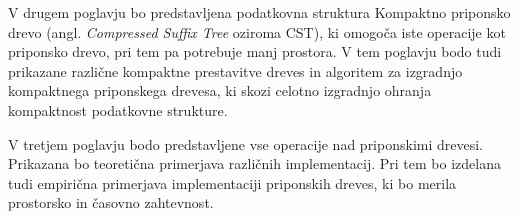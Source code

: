 
V drugem poglavju bo predstavljena podatkovna struktura Kompaktno priponsko drevo (angl. \textit{Compressed Suffix Tree} oziroma CST), ki omogoča iste operacije kot priponsko drevo, pri tem pa potrebuje manj prostora. V tem poglavju bodo tudi prikazane različne kompaktne prestavitve dreves in algoritem za izgradnjo kompaktnega priponskega drevesa, ki skozi celotno izgradnjo ohranja kompaktnost podatkovne strukture.

V tretjem poglavju bodo predstavljene vse operacije nad priponskimi drevesi. Prikazana bo teoretična primerjava različnih implementacij. Pri tem bo izdelana tudi empirična primerjava implementaciji priponskih dreves, ki bo merila prostorsko in časovno zahtevnost.